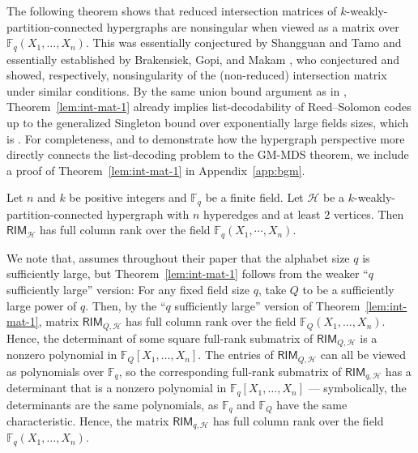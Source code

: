 \documentclass{article}[11pt]
\begin{document}
The following theorem shows that reduced intersection matrices of $k$-weakly-partition-connected hypergraphs are nonsingular when viewed as a matrix over $\mathbb{F}_q(X_1,\dots,X_n)$.
This was essentially conjectured by Shangguan and Tamo \cite{ST20} and essentially established by Brakensiek, Gopi, and Makam \cite{BGM23}, who conjectured and showed, respectively, nonsingularity of the (non-reduced) intersection matrix under similar conditions.
By the same union bound argument as in \cite[Theorem 5.8]{ST20}, Theorem~\ref{lem:int-mat-1} already implies list-decodability of Reed--Solomon codes up to the generalized Singleton bound over exponentially large fields sizes, which is \cite[Theorem 1.5]{BGM23}. 
For completeness, and to demonstrate how the hypergraph perspective more directly connects the list-decoding problem to the GM-MDS theorem, we include a proof of Theorem~\ref{lem:int-mat-1} in Appendix~\ref{app:bgm}.
\begin{theorem}
    Let $n$ and $k$ be positive integers and $\mathbb{F}_q$ be a finite field. 
    Let $\mathcal{H}$ be a $k$-weakly-partition-connected hypergraph with $n$ hyperedges and at least $2$ vertices.
    Then $\mathsf{RIM}_{\mathcal{H}}$ has full column rank over the field $\mathbb{F}_q(X_1,\cdots,X_n)$.
    \label{lem:int-mat-1}
\end{theorem}
\begin{remark}
    We note that, \cite{BGM23} assumes throughout their paper that the alphabet size $q$ is sufficiently large, but Theorem~\ref{lem:int-mat-1} follows from the weaker ``$q$ sufficiently large'' version:
    For any fixed field size $q$, take $Q$ to be a sufficiently large power of $q$.
    Then, by the ``$q$ sufficiently large'' version of Theorem~\ref{lem:int-mat-1}, matrix $\mathsf{RIM}_{Q,\mathcal{H}}$ has full column rank over the field $\mathbb{F}_Q(X_1,\dots,X_n)$.
    Hence, the determinant of some square full-rank submatrix of $\mathsf{RIM}_{Q,\mathcal{H}}$ is a nonzero polynomial in $\mathbb{F}_Q[X_1,\dots,X_n]$.
    The entries of $\mathsf{RIM}_{Q,\mathcal{H}}$ can all be viewed as polynomials over $\mathbb{F}_q$, so the corresponding full-rank submatrix of $\mathsf{RIM}_{q,\mathcal{H}}$ has a determinant that is a nonzero polynomial in $\mathbb{F}_q[X_1,\dots,X_n]$ --- symbolically, the determinants are the same polynomials, as $\mathbb{F}_q$ and $\mathbb{F}_Q$ have the same characteristic.
    Hence, the matrix $\mathsf{RIM}_{q,\mathcal{H}}$ has full column rank over the field $\mathbb{F}_q(X_1,\dots,X_n)$.
    \label{rem:int-mat-1}
\end{remark}
\end{document}
